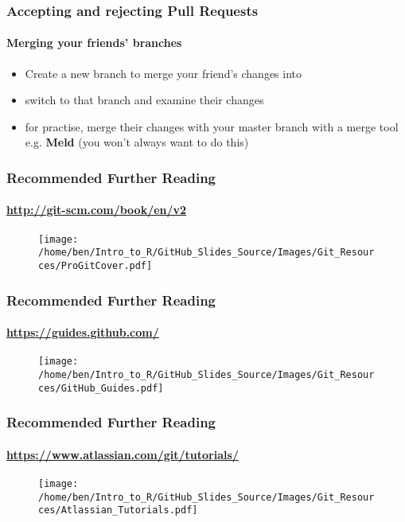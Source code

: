 \documentclass[xcolor=dvipsnames]{beamer}
\begin{document}
\begin{frame}
\frametitle{Accepting and rejecting Pull Requests}
\framesubtitle{Merging your friends' branches}
\begin{itemize}
\item Create a new branch to merge your friend's changes into 
\newline
\item switch to that branch and examine their changes
\newline
\item for practise, merge their changes with your master branch with a merge tool e.g. \textbf{Meld} (you won't always want to do this)
\end{itemize}
\end{frame}

\begin{frame}
\frametitle{Recommended Further Reading}
\framesubtitle{\url{http://git-scm.com/book/en/v2}}
\begin{center}
\begin{figure}
\texttt{[image: /home/ben/Intro\_to\_R/GitHub\_Slides\_Source/Images/Git\_Resources/ProGitCover.pdf]}
\end{figure}
\end{center}

\end{frame}

\begin{frame}
\frametitle{Recommended Further Reading}
\framesubtitle{\url{https://guides.github.com/}}
\begin{center}
\begin{figure}
\texttt{[image: /home/ben/Intro\_to\_R/GitHub\_Slides\_Source/Images/Git\_Resources/GitHub\_Guides.pdf]}
\end{figure}
\end{center}
\end{frame}

\begin{frame}
\frametitle{Recommended Further Reading}
\framesubtitle{\url{https://www.atlassian.com/git/tutorials/}}
\begin{center}
\begin{figure}

\texttt{[image: /home/ben/Intro\_to\_R/GitHub\_Slides\_Source/Images/Git\_Resources/Atlassian\_Tutorials.pdf]}
\end{figure}
\end{center}
\end{frame}
\end{document}
